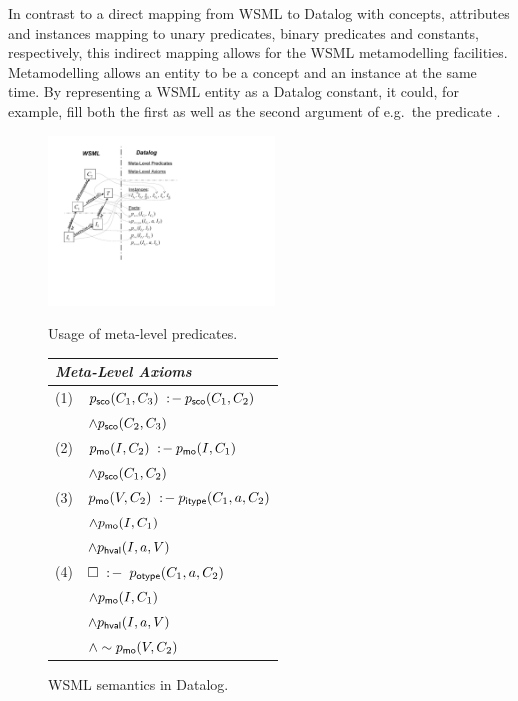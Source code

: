 In contrast to a direct mapping from WSML to Datalog with
concepts, attributes and instances mapping to unary predicates,
binary predicates and constants, respectively, this indirect
mapping allows for the WSML metamodelling facilities.
Metamodelling allows an entity to be a concept and an instance at
the same time. By representing a WSML entity as a Datalog
constant, it could, for example, fill both the first as well as
the second argument of e.g.\ the predicate \pmo.

\begin{figure}[tb]
\begin{minipage}[t]{6.5cm}
        \includegraphics[width=6cm]{figures/meta}
        \raggedleft
\caption{Usage of meta-level predicates. \label{fig:meta}}
\end{minipage}\hfill
\begin{minipage}[t]{4.7cm}
\begin{small}
\vspace{-4.8cm}
\begin{tabular}{|ll|}
  \hline
  \multicolumn{2}{|l|}{\rule{0cm}{3.2mm}{\normalsize \emph{Meta-Level Axioms}}} \\
  \hline
  (1) & $p_{\mathrm{\sf sco}}(C_1,C_3) \;:\!-\: p_{\mathrm{\sf sco}}(C_1,C_2)$ \\
      & \phantom{$\psco(C_1,C_3) \dlogrule$} $\wedge p_{\mathrm{\sf sco}}(C_2,C_3)$ \\
  (2) & $p_{\mathrm{\sf mo}}(I,C_2) \;:\!-\: p_{\mathrm{\sf mo}}(I,C_1)$ \\
      & \phantom{$\pmo(I,C_2) \dlogrule$} $\wedge p_{\mathrm{\sf sco}}(C_1,C_2)$ \\
  (3) & $p_{\mathrm{\sf mo}}(V,C_2) \;:\!-\: p_{\mathrm{\sf itype}}(C_1,a,C_2)$ \\
      & \phantom{$\pmo(V,C_2) \dlogrule$} $\wedge p_{\mathrm{\sf mo}}(I,C_1)$ \\
      & \phantom{$\pmo(V,C_2) \dlogrule$} $\wedge p_{\mathrm{\sf hval}}(I,a,V)$ \\
  (4) & $\square\;:\!-\: \; p_{\mathrm{\sf otype}}(C_1,a,C_2)$ \\
      & \phantom{$\dlogcstr \;$} $\wedge p_{\mathrm{\sf mo}}(I,C_1)$ \\
      & \phantom{$\dlogcstr \;$} $\wedge p_{\mathrm{\sf hval}}(I,a,V)$ \\
      & \phantom{$\dlogcstr \;$} $\wedge \sim p_{\mathrm{\sf mo}}(V,C_2)$ \\
 \hline
\end{tabular}
\caption{WSML semantics in Datalog. \label{tab:meta-level}}
\end{small}
\end{minipage}
\end{figure}

